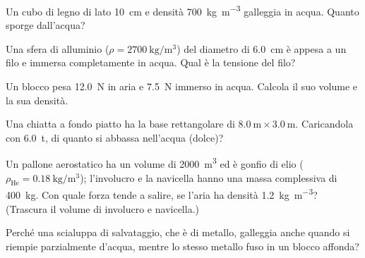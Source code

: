 \begin{esercizio}
Un cubo di legno di lato \SI{10}{\centi\metre} e densità \SI{700}{\kilo\gram\per\metre\cubed} galleggia in acqua. Quanto sporge dall'acqua?\\
\end{esercizio}

\begin{esercizio}
Una sfera di alluminio ($\rho = \SI{2700}{\kilo\gram\per\metre\cubed}$) del diametro di \SI{6,0}{\centi\metre} è appesa a un filo e immersa completamente in acqua. Qual è la tensione del filo?\\
\end{esercizio}

\begin{esercizio}
Un blocco pesa \SI{12,0}{\newton} in aria e \SI{7,5}{\newton} immerso in acqua. Calcola il suo volume e la sua densità.\\
\end{esercizio}

\begin{esercizio}
Una chiatta a fondo piatto ha la base rettangolare di $\SI{8,0}{\metre}\times\SI{3,0}{\metre}$. Caricandola con \SI{6,0}{\tonne}, di quanto si abbassa nell'acqua (dolce)?\\
\end{esercizio}

\begin{esercizio}
Un pallone aerostatico ha un volume di \SI{2000}{\metre\cubed} ed è gonfio di elio ($\rho_\text{He} = \SI{0,18}{\kilo\gram\per\metre\cubed}$); l'involucro e la navicella hanno una massa complessiva di \SI{400}{\kilo\gram}. Con quale forza tende a salire, se l'aria ha densità \SI{1,2}{\kilo\gram\per\metre\cubed}? (Trascura il volume di involucro e navicella.)\\
\end{esercizio}

\begin{esercizio}
Perché una scialuppa di salvataggio, che è di metallo, galleggia anche quando si riempie parzialmente d'acqua, mentre lo stesso metallo fuso in un blocco affonda?\\
\end{esercizio}


